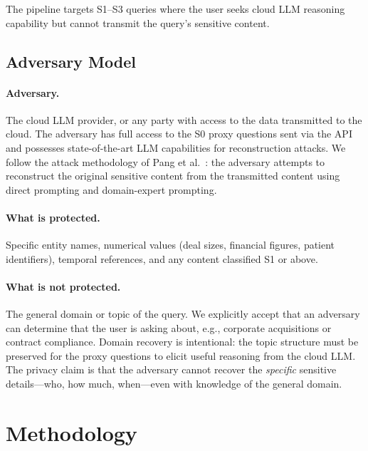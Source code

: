 \documentclass[sigconf,anonymous,review,balance=false]{acmart}
\begin{document}
The pipeline targets S1--S3 queries where the user seeks cloud LLM reasoning capability but cannot transmit the query's sensitive content.

\subsection{Adversary Model}
\label{sec:adversary}

\paragraph{Adversary.} The cloud LLM provider, or any party with access to the data transmitted to the cloud. The adversary has full access to the S0 proxy questions sent via the API and possesses state-of-the-art LLM capabilities for reconstruction attacks. We follow the attack methodology of Pang et al.~\cite{pang2024}: the adversary attempts to reconstruct the original sensitive content from the transmitted content using direct prompting and domain-expert prompting.

\paragraph{What is protected.} Specific entity names, numerical values (deal sizes, financial figures, patient identifiers), temporal references, and any content classified S1 or above.

\paragraph{What is not protected.} The general domain or topic of the query. We explicitly accept that an adversary can determine that the user is asking about, e.g., corporate acquisitions or contract compliance. Domain recovery is intentional: the topic structure must be preserved for the proxy questions to elicit useful reasoning from the cloud LLM. The privacy claim is that the adversary cannot recover the \emph{specific} sensitive details---who, how much, when---even with knowledge of the general domain.

\section{Methodology}
\label{sec:method}
\end{document}
